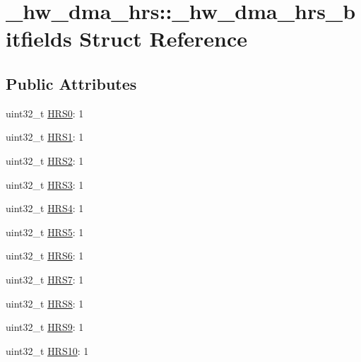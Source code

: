 \hypertarget{struct__hw__dma__hrs_1_1__hw__dma__hrs__bitfields}{}\section{\+\_\+hw\+\_\+dma\+\_\+hrs\+:\+:\+\_\+hw\+\_\+dma\+\_\+hrs\+\_\+bitfields Struct Reference}
\label{struct__hw__dma__hrs_1_1__hw__dma__hrs__bitfields}
\subsection*{Public Attributes}
\begin{DoxyCompactItemize}
\item 
uint32\+\_\+t \hyperlink{struct__hw__dma__hrs_1_1__hw__dma__hrs__bitfields_a26eff644aadef2b905c531a0a363908b}{H\+R\+S0}\+: 1
\item 
uint32\+\_\+t \hyperlink{struct__hw__dma__hrs_1_1__hw__dma__hrs__bitfields_a35104afd31fc73e041dc8a57de3d3618}{H\+R\+S1}\+: 1
\item 
uint32\+\_\+t \hyperlink{struct__hw__dma__hrs_1_1__hw__dma__hrs__bitfields_ae88744c11807343298dab73a546116fb}{H\+R\+S2}\+: 1
\item 
uint32\+\_\+t \hyperlink{struct__hw__dma__hrs_1_1__hw__dma__hrs__bitfields_a9dd8f2aaf2060aca41746d5d61ad5d8f}{H\+R\+S3}\+: 1
\item 
uint32\+\_\+t \hyperlink{struct__hw__dma__hrs_1_1__hw__dma__hrs__bitfields_a6e4169413cac3dfb989e5d2afa825c48}{H\+R\+S4}\+: 1
\item 
uint32\+\_\+t \hyperlink{struct__hw__dma__hrs_1_1__hw__dma__hrs__bitfields_acb846abec6954f6c36a8d2ef7db0231a}{H\+R\+S5}\+: 1
\item 
uint32\+\_\+t \hyperlink{struct__hw__dma__hrs_1_1__hw__dma__hrs__bitfields_a97c0c399d16c501a8d378c8d0a591d6c}{H\+R\+S6}\+: 1
\item 
uint32\+\_\+t \hyperlink{struct__hw__dma__hrs_1_1__hw__dma__hrs__bitfields_aa1a5a515e1800562ef87797a11021c7f}{H\+R\+S7}\+: 1
\item 
uint32\+\_\+t \hyperlink{struct__hw__dma__hrs_1_1__hw__dma__hrs__bitfields_ac72b3508f83129ea1829a586081ea622}{H\+R\+S8}\+: 1
\item 
uint32\+\_\+t \hyperlink{struct__hw__dma__hrs_1_1__hw__dma__hrs__bitfields_a2297794af269cc1fa9f1920f9d5872d4}{H\+R\+S9}\+: 1
\item 
uint32\+\_\+t \hyperlink{struct__hw__dma__hrs_1_1__hw__dma__hrs__bitfields_a3d1fc1de709cdfbaced850ced6fe5857}{H\+R\+S10}\+: 1

\end{DoxyCompactItemize}

